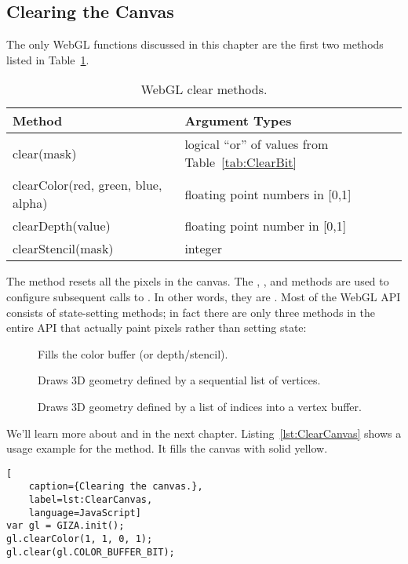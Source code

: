 \subsection{Clearing the Canvas}

The only WebGL functions discussed in this chapter are the first two methods listed in Table~\ref{tab:Clearing}.

\begin{table}[htb]\centering
  \begin{tabular}{ll}
    \hline
    Method & Argument Types \\
    \hline
    clear(mask) & logical ``or'' of values from Table~\ref{tab:ClearBit} \\
    clearColor(red, green, blue, alpha)  & floating point numbers in [0,1] \\
    clearDepth(value) & floating point number in [0,1] \\
    clearStencil(mask) & integer \\
    \hline
  \end{tabular}
  \caption{WebGL clear methods.}
  \label{tab:Clearing}
\end{table}

The  method resets all the pixels in the canvas.  The , , and  methods are used to configure subsequent calls to .  In other words, they are .  Most of the WebGL API consists of state-setting methods; in fact there are only three methods in the entire API that actually paint pixels rather than setting state:

\begin{description}
\item[] Fills the color buffer (or depth/stencil).
\item[] Draws 3D geometry defined by a sequential list of vertices.
\item[] Draws 3D geometry defined by a list of indices into a vertex buffer.
\end{description}

We'll learn more about  and  in the next chapter.  Listing~\ref{lst:ClearCanvas} shows a usage example for the  method.  It fills the canvas with solid yellow.

\begin{lstlisting}[
    caption={Clearing the canvas.},
    label=lst:ClearCanvas,
    language=JavaScript]
var gl = GIZA.init();
gl.clearColor(1, 1, 0, 1);
gl.clear(gl.COLOR_BUFFER_BIT);
\end{lstlisting}

